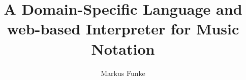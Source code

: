 \documentclass[]{htwg-report}
\begin{document}
\frontmatter



\title[A DSL and web-based Interpreter for Music Notation]{A Domain-Specific Language and web-based Interpreter for Music Notation}

\author{Markus Funke}


\makecover[]
%          









\tableofcontents

\mainmatter














\appendix




\printbibliography[heading=bibintoc]
\end{document}
